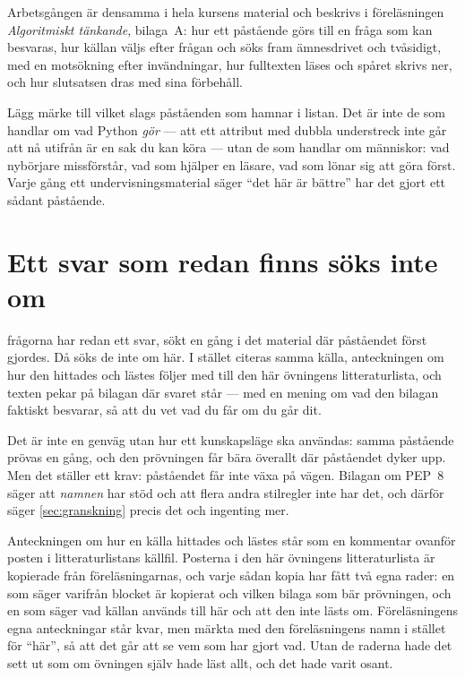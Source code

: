 Arbetsgången är densamma i hela kursens material och beskrivs i
föreläsningen \emph{Algoritmiskt tänkande}, bilaga~A: hur ett påstående
görs till en fråga som kan besvaras, hur källan väljs efter frågan och
söks fram ämnesdrivet och tvåsidigt, med en motsökning efter
invändningar, hur fulltexten läses och spåret skrivs ner, och hur
slutsatsen dras med sina förbehåll.

Lägg märke till vilket slags påståenden som hamnar i listan.  Det är
inte de som handlar om vad Python \emph{gör} --- att ett attribut med dubbla
understreck inte går att nå utifrån är en sak du kan köra --- utan de som
handlar om människor: vad nybörjare missförstår, vad som hjälper en
läsare, vad som lönar sig att göra först.  Varje gång ett
undervisningsmaterial säger \enquote{det här är bättre} har det gjort ett
sådant påstående.

\section{Ett svar som redan finns söks inte om}
\label{sec:ovn-atervinning}

 frågorna har redan ett
svar, sökt en gång i det material där påståendet först gjordes.  Då söks de inte om här.  I
stället citeras samma källa, anteckningen om hur den hittades och
lästes följer med till den här övningens litteraturlista, och texten
pekar på bilagan där svaret står --- med en mening om vad den bilagan
faktiskt besvarar, så att du vet vad du får om du går dit.

Det är inte en genväg utan hur ett kunskapsläge ska användas: samma
påstående prövas en gång, och den prövningen får bära överallt där
påståendet dyker upp.  Men det ställer ett krav: påståendet får inte
växa på vägen.  Bilagan om PEP~8 säger att \emph{namnen} har stöd och
att flera andra stilregler inte har det, och därför säger
\cref{sec:granskning} precis det och ingenting mer.

Anteckningen om hur en källa hittades och lästes står som en kommentar
ovanför posten i litteraturlistans källfil.  Posterna i den här
övningens litteraturlista är kopierade från
föreläsningarnas, och varje sådan kopia har fått två egna rader: en som
säger varifrån blocket är kopierat och vilken bilaga som bär prövningen,
och en som säger vad källan används till här och att den inte lästs om.
Föreläsningens egna anteckningar står kvar, men märkta med den
föreläsningens namn i stället för \enquote{här}, så att det går att se
vem som har gjort vad.  Utan de raderna hade det sett ut som om övningen
själv hade läst allt, och det hade varit osant.

